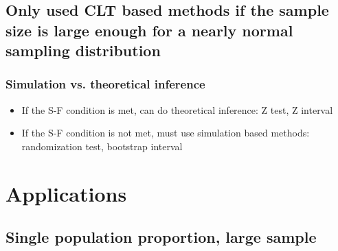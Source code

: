 \documentclass[11pt,containsverbatim,handout,xcolor=xelatex,dvipsnames,table]{beamer}
\begin{document}

\subsection{Only used CLT based methods if the sample size is large enough for a nearly normal sampling distribution}
\label{mi4}


\begin{frame}
\frametitle{Simulation vs. theoretical inference}

\begin{itemize}

\item If the S-F condition is met, can do theoretical inference: Z test, Z interval

\item If the S-F condition is not met, must use simulation based methods: randomization test, bootstrap interval

\end{itemize}

\end{frame}

\section{Applications}


\subsection{Single population proportion, large sample}


\begin{frame}

\vfill


\vfill

\end{frame}


\begin{frame}

\vfill


\vfill

\end{frame}
\end{document}
